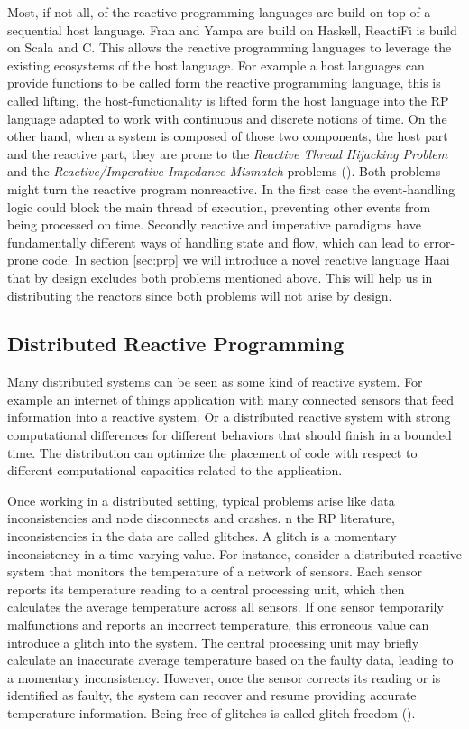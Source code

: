 \documentclass[a4paper]{book}
\begin{document}
Most, if not all, of the reactive programming languages are build on top of a sequential host language. Fran and Yampa are build on Haskell, ReactiFi is build on Scala and C. This allows the reactive programming languages to leverage the existing ecosystems of the host language. For example a host languages can provide functions to be called form the reactive programming language, this is called lifting, the host-functionality is lifted form the host language into the RP language adapted to work with continuous and discrete notions of time. On the other hand, when a system is composed of those two components, the host part and the reactive part, they are prone to the \textit{Reactive Thread Hijacking Problem} and the \textit{Reactive/Imperative Impedance Mismatch} problems (\cite{vonder_tackling_2020}). Both problems might turn the reactive program nonreactive. In the first case the event-handling logic could block the main thread of execution, preventing other events from being processed on time. Secondly reactive and imperative paradigms have fundamentally different ways of handling state and flow, which can lead to error-prone code. In section \ref{sec:prp} we will introduce a novel reactive language Haai that by design excludes both problems mentioned above. This will help us in distributing the reactors since both problems will not arise by design.  


\subsection{Distributed Reactive Programming} \label{sec:drp}


Many distributed systems can be seen as some kind of reactive system. For example an internet of things application with many connected sensors that feed information into a reactive system. Or a distributed reactive system with strong computational differences for different behaviors that should finish in a bounded time. The distribution can optimize the placement of code with respect to different computational capacities related to the application. 

Once working in a distributed setting, typical problems arise like data inconsistencies and node disconnects and crashes. n the RP literature, inconsistencies in the data are called glitches. A glitch is a momentary inconsistency in a time-varying value. For instance, consider a distributed reactive system that monitors the temperature of a network of sensors. Each sensor reports its temperature reading to a central processing unit, which then calculates the average temperature across all sensors. If one sensor temporarily malfunctions and reports an incorrect temperature, this erroneous value can introduce a glitch into the system. The central processing unit may briefly calculate an inaccurate average temperature based on the faulty data, leading to a momentary inconsistency. However, once the sensor corrects its reading or is identified as faulty, the system can recover and resume providing accurate temperature information. Being free of glitches is called glitch-freedom (\cite{DBLP:journals/tse/MargaraS18}). 
\end{document}
